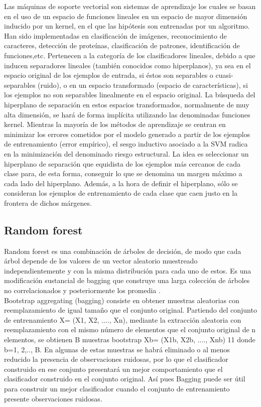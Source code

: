 Las máquinas de soporte vectorial son sistemas de aprendizaje los
cuales se basan en el uso de un espacio de funciones lineales en un espacio de mayor dimensión inducido
por un kernel, en el que las hipótesis son entrenadas por un algoritmo\citep{CT8}.
Han sido implementadas en clasificación de imágenes, reconocimiento de caracteres, detección de
proteínas, clasificación de patrones, identificación de funciones,etc.
Pertenecen a la categoría de los clasificadores lineales, debido a que inducen separadores lineales
(también conocidos como hiperplanos), ya sea en el espacio original de los ejemplos de entrada, si éstos son separables o cuasi-separables (ruido), o en un espacio transformado (espacio de características),
si los ejemplos no son separables linealmente en el espacio original. La búsqueda del hiperplano
de separación en estos espacios transformados, normalmente de muy alta dimensión, se hará de forma
implícita utilizando las denominadas funciones kernel. Mientras la mayoría de los métodos de aprendizaje
se centran en minimizar los errores cometidos por el modelo generado a partir de los ejemplos
de entrenamiento (error empírico), el sesgo inductivo asociado a la SVM radica en la minimización
del denominado riesgo estructural.
La idea es seleccionar un hiperplano de separación que equidista de los ejemplos más cercanos de
cada clase para, de esta forma, conseguir lo que se denomina un margen máximo a cada lado del hiperplano.
Además, a la hora de definir el hiperplano, sólo se consideran los ejemplos de entrenamiento
de cada clase que caen justo en la frontera de dichos márgenes. 

\subsection{Random forest}

Random forest es una combinación de árboles de decisión, de modo que cada árbol depende de los valores de un vector 
aleatorio muestreado independientemente y con la misma distribución para cada uno de estos. Es una modificación sustancial de bagging que construye una 
larga colección de árboles no correlacionados y posteriormente los promedia \citep{CT9}.\\


Bootstrap aggregating (bagging) consiste en obtener muestras aleatorias con reemplazamiento de igual tamaño que el conjunto original\citep{CT24}. Partiendo del conjunto de entrenamiento X= (X1, X2, ...., Xn), mediante la extracción aleatoria con reemplazamiento con el mismo número de elementos que el conjunto original de n elementos, se obtienen B muestras bootstrap Xb= (X1b, X2b, ...., Xnb)
11
donde b=1, 2,.., B. En algunas de estas muestras se habrá eliminado o al menos reducido la presencia de observaciones ruidosas, por lo que el clasificador construido en ese conjunto presentará un mejor comportamiento que el clasificador construido en el conjunto original. Así pues Bagging puede ser útil para construir un mejor clasificador cuando el conjunto de entrenamiento presente observaciones ruidosas.




